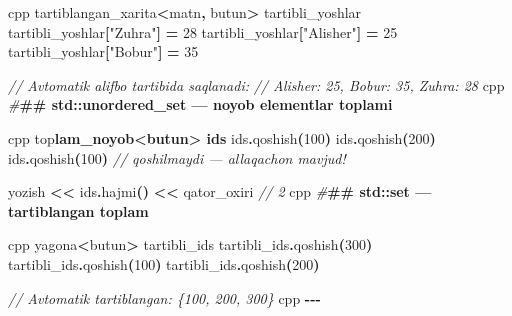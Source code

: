 \documentclass[a4paper,11pt,twoside,openright]{book}
\newenvironment{Shaded}{\begin{snugshade}}{\end{snugshade}}
\newcommand{\CharTok}[1]{\textcolor[rgb]{0.31,0.60,0.02}{#1}}
\newcommand{\CommentTok}[1]{\textcolor[rgb]{0.56,0.35,0.01}{\textit{#1}}}
\newcommand{\DecValTok}[1]{\textcolor[rgb]{0.00,0.00,0.81}{#1}}
\newcommand{\ErrorTok}[1]{\textcolor[rgb]{0.64,0.00,0.00}{\textbf{#1}}}
\newcommand{\NormalTok}[1]{#1}
\newcommand{\OperatorTok}[1]{\textcolor[rgb]{0.81,0.36,0.00}{\textbf{#1}}}
\newcommand{\PreprocessorTok}[1]{\textcolor[rgb]{0.56,0.35,0.01}{\textit{#1}}}
\newcommand{\StringTok}[1]{\textcolor[rgb]{0.31,0.60,0.02}{#1}}
\begin{document}
\begin{Shaded}
\begin{Highlighting}[]
\ErrorTok{\textasciigrave{}\textasciigrave{}\textasciigrave{}}\NormalTok{cpp}
\NormalTok{tartiblangan\_xarita}\OperatorTok{\textless{}}\NormalTok{matn}\OperatorTok{,}\NormalTok{ butun}\OperatorTok{\textgreater{}}\NormalTok{ tartibli\_yoshlar}
\NormalTok{tartibli\_yoshlar}\OperatorTok{[}\StringTok{"Zuhra"}\OperatorTok{]} \OperatorTok{=} \DecValTok{28}
\NormalTok{tartibli\_yoshlar}\OperatorTok{[}\StringTok{"Alisher"}\OperatorTok{]} \OperatorTok{=} \DecValTok{25}
\NormalTok{tartibli\_yoshlar}\OperatorTok{[}\StringTok{"Bobur"}\OperatorTok{]} \OperatorTok{=} \DecValTok{35}

\CommentTok{// Avtomatik alifbo tartibida saqlanadi:}
\CommentTok{// Alisher: 25, Bobur: 35, Zuhra: 28}
\ErrorTok{\textasciigrave{}\textasciigrave{}\textasciigrave{}}\NormalTok{cpp}
\PreprocessorTok{\#}\ErrorTok{\#\# \textasciigrave{}std::unordered\_set\textasciigrave{} — noyob elementlar to\textquotesingle{}plami}

\ErrorTok{\textasciigrave{}\textasciigrave{}\textasciigrave{}}\NormalTok{cpp}
\NormalTok{to}\CharTok{\textquotesingle{}p}\ErrorTok{lam\_noyob\textless{}butun\textgreater{} ids}
\NormalTok{ids}\OperatorTok{.}\NormalTok{qoshish}\OperatorTok{(}\DecValTok{100}\OperatorTok{)}
\NormalTok{ids}\OperatorTok{.}\NormalTok{qoshish}\OperatorTok{(}\DecValTok{200}\OperatorTok{)}
\NormalTok{ids}\OperatorTok{.}\NormalTok{qoshish}\OperatorTok{(}\DecValTok{100}\OperatorTok{)}    \CommentTok{// qo\textquotesingle{}shilmaydi — allaqachon mavjud!}

\NormalTok{yozish }\OperatorTok{\textless{}\textless{}}\NormalTok{ ids}\OperatorTok{.}\NormalTok{hajmi}\OperatorTok{()} \OperatorTok{\textless{}\textless{}}\NormalTok{ qator\_oxiri   }\CommentTok{// 2}
\ErrorTok{\textasciigrave{}\textasciigrave{}\textasciigrave{}}\NormalTok{cpp}
\PreprocessorTok{\#}\ErrorTok{\#\# \textasciigrave{}std::set\textasciigrave{} — tartiblangan to\textquotesingle{}plam}

\ErrorTok{\textasciigrave{}\textasciigrave{}\textasciigrave{}}\NormalTok{cpp}
\NormalTok{yagona}\OperatorTok{\textless{}}\NormalTok{butun}\OperatorTok{\textgreater{}}\NormalTok{ tartibli\_ids}
\NormalTok{tartibli\_ids}\OperatorTok{.}\NormalTok{qoshish}\OperatorTok{(}\DecValTok{300}\OperatorTok{)}
\NormalTok{tartibli\_ids}\OperatorTok{.}\NormalTok{qoshish}\OperatorTok{(}\DecValTok{100}\OperatorTok{)}
\NormalTok{tartibli\_ids}\OperatorTok{.}\NormalTok{qoshish}\OperatorTok{(}\DecValTok{200}\OperatorTok{)}

\CommentTok{// Avtomatik tartiblangan: \{100, 200, 300\}}
\ErrorTok{\textasciigrave{}\textasciigrave{}\textasciigrave{}}\NormalTok{cpp}
\OperatorTok{{-}{-}{-}}


\end{Highlighting}
\end{Shaded}
\end{document}
